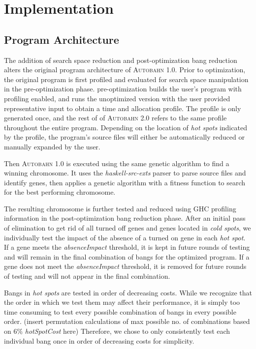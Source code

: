 \documentclass[format=sigplan]{acmart}
\newcommand{\hotspot}[0]{\textit{hot spot}}
\newcommand{\hotspots}[0]{\textit{hot spots}}
\newcommand{\coldspots}[0]{\textit{cold spots}}
\newcommand{\hotspotcost}[0]{\textit{hotSpotCost}}
\newcommand{\Ao}[0]{\textsc{Autobahn 1.0}}
\newcommand{\At}[0]{\textsc{Autobahn 2.0}}
\newcommand{\preopt}[0]{pre-optimization}
\newcommand{\postopt}[0]{post-optimization}
\newcommand{\absim}[0]{\textit{absenceImpact}}
\begin{document}
\section{Implementation}

\subsection{Program Architecture}

The addition of search space reduction and \postopt{} bang reduction alters the original program architecture of \Ao{}. Prior to optimization, the original program is first profiled and evaluated for search space manipulation in the \preopt{} phase. \preopt{} builds the user's program with profiling enabled, and runs the unoptimized version with the user provided representative input to obtain a time and allocation profile. The profile is only generated once, and the rest of of \At{} refers to the same profile throughout the entire program. Depending on the location of \hotspots{} indicated by the profile, the program's source files will either be automatically reduced or manually expanded by the user. 

Then \Ao{} is executed using the same genetic algorithm to find a winning chromosome. It uses the \textit{haskell-src-exts} parser to parse source files and identify genes, then applies a genetic algorithm with a fitness function to search for the best performing chromosome.

The resulting chromosome is further tested and reduced using GHC profiling information in the \postopt{} bang reduction phase. After an initial pass of elimination to get rid of all turned off genes and genes located in \coldspots{}, we individually test the impact of the absence of a turned on gene in each \hotspot{}. If a gene meets the \absim{} threshold, it is kept in future rounds of testing and will remain in the final combination of bangs for the optimized program. If a gene does not meet the \absim{} threshold, it is removed for future rounds of testing and will not appear in the final combination. 

Bangs in \hotspots{} are tested in order of decreasing costs. While we recognize that the order in which we test them may affect their performance, it is simply too time consuming to test every possible combination of bangs in every possible order. (insert permutation calculations of max possible no. of combinations based on 6\% \hotspotcost{} here) Therefore, we chose to only consistently test each individual bang once in order of decreasing costs for simplicity. 
\end{document}
